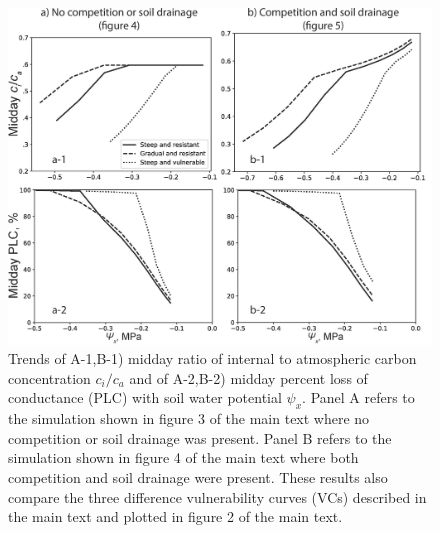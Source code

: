 \documentclass[utf8]{frontiers_suppmat} %
\begin{document}
\begin{figure}[b]
    \centering
    \includegraphics[scale=0.75]{PLC_cica.jpg}
    \caption{Trends of A-1,B-1) midday ratio of internal to atmospheric carbon concentration $c_i / c_a$ and of A-2,B-2) midday percent loss of conductance (PLC) with soil water potential $\psi_x$. Panel A refers to the simulation shown in figure 3 of the main text where no competition or soil drainage was present. Panel B refers to the simulation shown in figure 4 of the main text where both competition and soil drainage were present. These results also compare the three difference vulnerability curves (VCs) described in the main text and plotted in figure 2 of the main text.}
    \label{fig:PLC_cica}
\end{figure}

\end{document}
